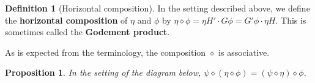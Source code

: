 \documentclass{article}
\newtheorem{prop}[thm]{Proposition}
\theoremstyle{definition}
\newtheorem{defn}[thm]{Definition}
\theoremstyle{remark}
\begin{document}
\begin{defn}[Horizontal composition]\label{horizcomp}
	In the setting described above, we define the \textbf{horizontal composition} of $\eta$ and $\phi$ by $\eta \diamond \phi = \eta H' \cdot G\phi = G'\phi\cdot \eta H$. This is sometimes called the \textbf{Godement product}.
\end{defn}
As is expected from the terminology, the composition $\diamond$ is associative.
\begin{prop}
	In the setting of the diagram below, $\psi \diamond (\eta \diamond \phi)= (\psi \diamond \eta)\diamond \phi$.
	\begin{figure}[h]
		\centering
	\end{figure}
\end{prop}
\end{document}
